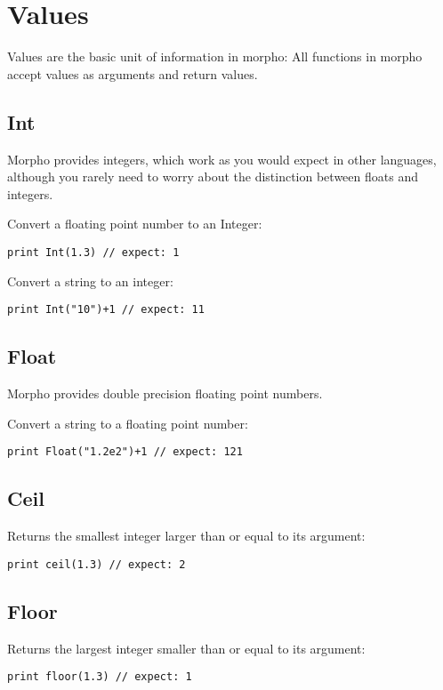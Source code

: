 \hypertarget{values}{%
\section{Values}\label{values}}

Values are the basic unit of information in morpho: All functions in
morpho accept values as arguments and return values.

\hypertarget{int}{%
\subsection{Int}\label{int}}

Morpho provides integers, which work as you would expect in other
languages, although you rarely need to worry about the distinction
between floats and integers.

Convert a floating point number to an Integer:

\begin{lstlisting}
print Int(1.3) // expect: 1
\end{lstlisting}

Convert a string to an integer:

\begin{lstlisting}
print Int("10")+1 // expect: 11
\end{lstlisting}

\hypertarget{float}{%
\subsection{Float}\label{float}}

Morpho provides double precision floating point numbers.

Convert a string to a floating point number:

\begin{lstlisting}
print Float("1.2e2")+1 // expect: 121
\end{lstlisting}

\hypertarget{ceil}{%
\subsection{Ceil}\label{ceil}}

Returns the smallest integer larger than or equal to its argument:

\begin{lstlisting}
print ceil(1.3) // expect: 2
\end{lstlisting}

\hypertarget{floor}{%
\subsection{Floor}\label{floor}}

Returns the largest integer smaller than or equal to its argument:

\begin{lstlisting}
print floor(1.3) // expect: 1
\end{lstlisting}
